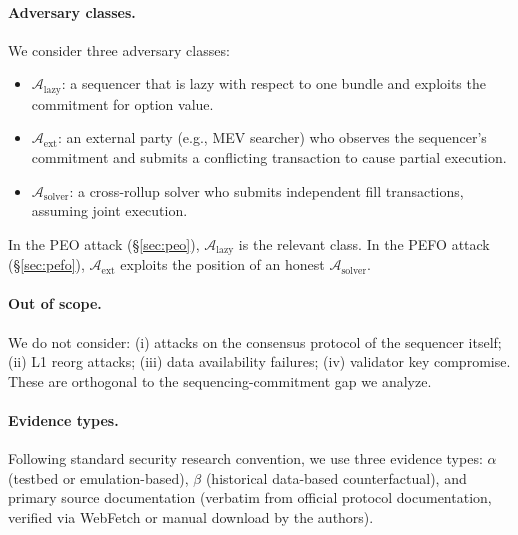 \paragraph{Adversary classes.}
We consider three adversary classes:
\begin{itemize}
  \item $\mathcal{A}_{\text{lazy}}$: a sequencer that is lazy with respect
    to one bundle and exploits the commitment for option value.
  \item $\mathcal{A}_{\text{ext}}$: an external party (e.g., MEV
    searcher) who observes the sequencer's commitment and submits a
    conflicting transaction to cause partial execution.
  \item $\mathcal{A}_{\text{solver}}$: a cross-rollup solver who
    submits independent fill transactions, assuming joint execution.
\end{itemize}
In the PEO attack (\S\ref{sec:peo}), $\mathcal{A}_{\text{lazy}}$ is
the relevant class. In the PEFO attack (\S\ref{sec:pefo}),
$\mathcal{A}_{\text{ext}}$ exploits the position of an honest
$\mathcal{A}_{\text{solver}}$.

\paragraph{Out of scope.}
We do not consider: (i) attacks on the consensus protocol of the sequencer
itself; (ii) L1 reorg attacks; (iii) data availability failures; (iv)
validator key compromise. These are orthogonal to the sequencing-commitment
gap we analyze.

\paragraph{Evidence types.}
Following standard security research convention, we use three evidence
types: $\alpha$ (testbed or emulation-based), $\beta$ (historical
data-based counterfactual), and primary source documentation (verbatim
from official protocol documentation, verified via WebFetch or manual
download by the authors).
